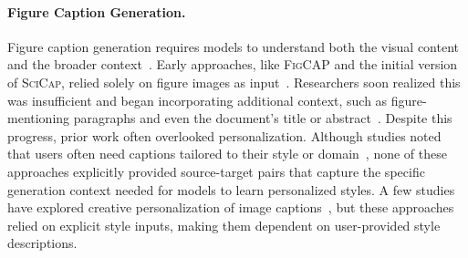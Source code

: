 \paragraph{Figure Caption Generation.}
Figure caption generation requires models to understand both the visual content and the broader context~\cite{kantharaj-etal-2022-chart,wang2024charxiv,hu2024mplug,obeid-hoque-2020-chart}.
Early approaches, like \textsc{FigCAP} and the initial version of \textsc{SciCap}, relied solely on figure images as input~\cite{chen2020figure,hsu-etal-2021-scicap-generating}.
Researchers soon realized this was insufficient and began incorporating additional context, such as figure-mentioning paragraphs and even the document's title or abstract~\cite{huang-etal-2023-summaries,yang2024scicap+,stokes2022striking}.
Despite this progress, prior work often overlooked personalization. 
Although studies noted that users often need captions tailored to their style or domain~\cite{hsu2025large,huang-etal-2023-summaries},
none of these approaches explicitly provided source-target pairs %
that capture the specific generation context needed for models to learn personalized styles. %
A few studies have explored creative personalization of image captions~\cite{Shuster2019-mi, Anantha-Ramakrishnan2025-je}, but these approaches relied on explicit style inputs, making them dependent on user-provided style descriptions.








